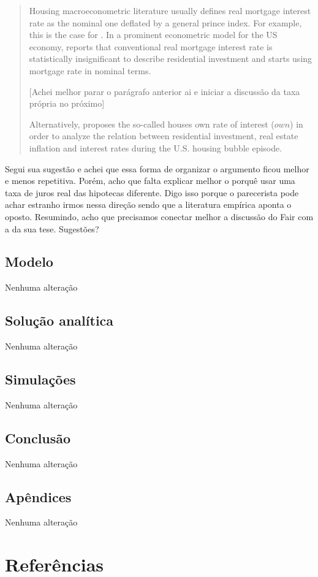 \documentclass[11pt]{article}
\begin{document}
\begin{quote}
Housing macroeconometric literature usually defines real mortgage interest rate as the nominal one deflated by a general prince index.
For example, this is the case for \textcites{goodhart_house_2008}{arestis_economic_2019}{huang_is_2020}.
In a prominent econometric model for the US economy, \textcite{fair_macroeconometric_2013} reports that conventional real mortgage interest rate is statistically insignificant to describe residential investment and starts using mortgage rate in nominal terms.

[Achei melhor parar o parágrafo anterior ai e iniciar a discussão da taxa própria no próximo]

Alternatively, \textcite{teixeira_crescimento_2015} proposes the so-called houses own rate of interest (\(own\)) in order to analyze the relation between residential investment, real estate inflation and interest rates during the U.S. housing bubble episode.
\end{quote}


Segui sua sugestão e achei que essa forma de organizar o argumento ficou melhor e menos repetitiva. Porém, acho que falta explicar melhor o porquê usar uma taxa de juros real das hipotecas diferente. Digo isso porque o parecerista pode achar estranho irmos nessa direção sendo que a literatura empírica aponta o oposto. Resumindo, acho que precisamos conectar melhor a discussão do Fair com a da sua tese. Sugestões?



\subsection*{Modelo}
\label{sec:org2496398}

Nenhuma alteração

\subsection*{Solução analítica}
\label{sec:orgdcf3490}

Nenhuma alteração
\subsection*{Simulações}
\label{sec:orgee97bb4}

Nenhuma alteração

\subsection*{Conclusão}
\label{sec:org3cc059d}

Nenhuma alteração

\subsection*{Apêndices}
\label{sec:org0416abe}

Nenhuma alteração

\section*{Referências}
\label{sec:orgefd8e39}
\printbibliography[heading=none]
\end{document}
